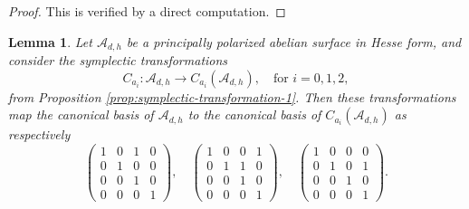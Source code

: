 \documentclass[11pt]{amsart}
\newtheorem{lemma}[theorem]{Lemma}
\theoremstyle{definition}
\newcommand{\A}{\mathcal{A}}
\begin{document}
\begin{proof}
	This is verified by a direct computation.
\end{proof}

\begin{lemma} \label{lem:symplectic-3torsion}
	Let  $\A_{d,h}$ be a principally polarized abelian surface in Hesse form, and consider the symplectic transformations 
	\[
	C_{a_i}: \A_{d,h} \to C_{a_i}(\A_{d,h}), \quad \text{for } i = 0,1,2,
	\]
	from Proposition \ref{prop:symplectic-transformation-1}. 
	Then these transformations map the canonical basis of $\A_{d,h}$ to the canonical basis of $C_{a_i}(\A_{d,h})$ as respectively
	\[
	\begin{pmatrix}
		1 & 0 & 1 & 0\\
		0 & 1 & 0 & 0\\
		0 & 0 & 1 & 0\\
		0 & 0 & 0 & 1
	\end{pmatrix},\quad 
	\begin{pmatrix}
		1 & 0 & 0 & 1\\
		0 & 1 & 1 & 0\\
		0 & 0 & 1 & 0\\
		0 & 0 & 0 & 1
	\end{pmatrix},\quad 
	\begin{pmatrix}
		1 & 0 & 0 & 0\\
		0 & 1 & 0 & 1\\
		0 & 0 & 1 & 0\\
		0 & 0 & 0 & 1
	\end{pmatrix}.
	\]
\end{lemma}
\end{document}
